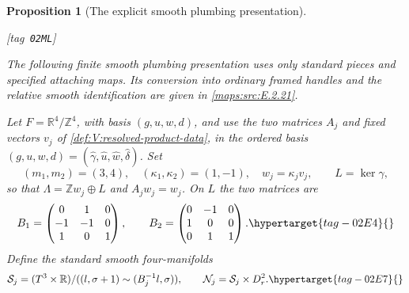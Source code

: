\documentclass[11pt,a4paper]{article}
\makeatletter
\numberwithin{equation}{section}
\newtheorem{proposition}[proposition]{Proposition}
\theoremstyle{definition}
\newcommand{\StatementRecord}[4]{{\upshape\footnotesize[tag~\texttt{#3}]}\enspace\ignorespaces}
\newcommand{\SeriesRefText}[1]{\ifcsname SRef@#1\endcsname\csname SRef@#1\endcsname\else\textbf{UNRESOLVED}\fi}
\newcommand{\SeriesRef}[1]{\ifmmode\text{\SeriesRefText{#1}}\else\SeriesRefText{#1}\fi}
\makeatother
\begin{document}
\begin{proposition}[The explicit smooth plumbing presentation]\hypertarget{tag-02ML}{}\label{maps:src:E.2.20}
\StatementRecord{maps:src:E.2.20}{proved}{02ML}{\cref{maps:src:E.2.21}, \cref{maps:src:E.2.19}, \eqref{maps:eq:E.S1}, \eqref{maps:eq:E.T2}, \eqref{maps:eq:E.U7}, \eqref{maps:eq:E.U10}, \eqref{maps:eq:E.U8}, \eqref{maps:eq:E.U9}, \SeriesRef{maps:src:B.5.1}, \cref{maps:src:E.2.6}}


The following finite smooth plumbing presentation uses only standard
pieces and specified attaching maps. Its conversion into ordinary
framed handles and the relative smooth identification are given in \ref{maps:src:E.2.21}.

Let $F=\mathbb R^4/\mathbb Z^4$, with basis $(g,u,w,d)$, and use the
two matrices $A_j$ and fixed vectors $v_j$ of \cref{def:V:resolved-product-data}, in the ordered basis $(g,u,w,d)=(\widehat\gamma,\widehat u,\widehat w,\widehat\delta)$. Set
\[
 (m_1,m_2)=(3,4),\quad(\kappa_1,\kappa_2)=(1,-1),\quad
 w_j=\kappa_jv_j,\qquad L=\ker\gamma,
\]
so that $\Lambda=\mathbb Zw_j\oplus L$ and $A_jw_j=w_j$.
On $L$ the two matrices are
\begin{equation}
 B_1=\begin{pmatrix}0&1&0\\-1&-1&0\\1&0&1\end{pmatrix},
 \qquad
 B_2=\begin{pmatrix}0&-1&0\\1&0&0\\0&1&1\end{pmatrix}.
 \hypertarget{tag-02E4}{}\label{maps:eq:E.U1}
\end{equation}
Define the standard smooth four-manifolds
\begin{equation}
 \mathcal S_j=(T^3\times\mathbb R)/
       ((l,\sigma+1)\sim(B_j^{-1}l,\sigma)),
 \qquad \mathcal N_j=\mathcal S_j\times D^2_r.
 \hypertarget{tag-02E7}{}\label{maps:eq:E.U2}
\end{equation}



\end{proposition}
\end{document}
